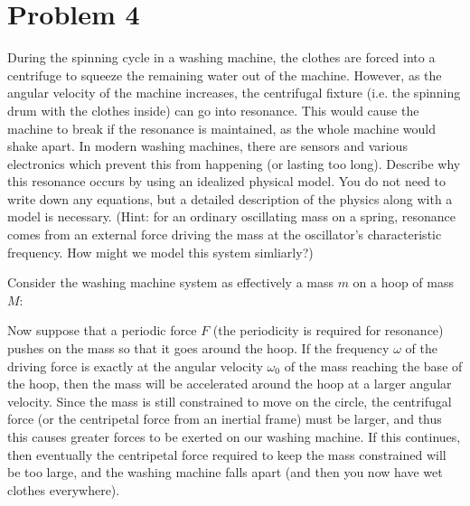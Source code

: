 \documentclass[10pt]{article}
\begin{document}
    \pagebreak

    \section*{Problem 4}
    During the spinning cycle in a washing machine, the clothes are forced into a centrifuge to squeeze the remaining water out of the machine. However, as the angular velocity of the machine increases, the centrifugal fixture (i.e. the spinning drum with the clothes inside) can go into resonance. This would cause the machine to break if the resonance is maintained, as the whole machine would shake apart. In modern washing machines, there are sensors and various electronics which prevent this from happening (or lasting too long). Describe why this resonance occurs by using an idealized physical model. You do not need to write down any equations, but a detailed description of the physics along with a model is necessary. (Hint: for an ordinary oscillating mass on a spring, resonance comes from an external force driving the mass at the oscillator's characteristic frequency. How might we model this system simliarly?)


    \begin{solution}
        Consider the washing machine system as effectively a mass $m$ on a hoop of mass $M$: 

        \begin{center}
        \end{center}

        Now suppose that a periodic force $F$ (the periodicity is required for resonance) pushes on the mass so that it goes around the hoop. If the frequency $\omega$ of the driving force is exactly at the angular velocity $\omega_0$ of the mass reaching the base of the hoop, then the mass will be accelerated around the hoop at a larger angular velocity. Since the mass is still constrained to move on the circle, the centrifugal force (or the centripetal force from an inertial frame) must be larger, and thus this causes greater forces to be exerted on our washing machine. If this continues, then eventually the centripetal force required to keep the mass constrained will be too large, and the washing machine falls apart (and then you now have wet clothes everywhere). 
    \end{solution}
\end{document}
